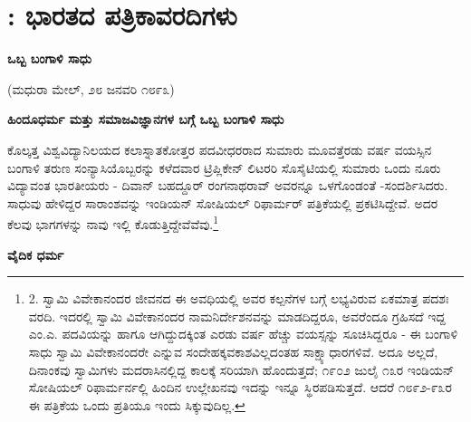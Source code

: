 
\chapter{: ಭಾರತದ ಪತ್ರಿಕಾವರದಿಗಳು}

\begin{center}
\textbf{ಒಬ್ಬ ಬಂಗಾಳಿ ಸಾಧು}
\end{center}

\begin{center}
(ಮಧುರಾ ಮೇಲ್, ೨೮ ಜನವರಿ ೧೮೯೩)
\end{center}

\begin{center}
\textbf{ಹಿಂದೂಧರ್ಮ ಮತ್ತು ಸಮಾಜವಿಜ್ಞಾನಗಳ ಬಗ್ಗೆ ಒಬ್ಬ ಬಂಗಾಳಿ ಸಾಧು}
\end{center}

ಕೊಲ್ಕತ್ತ ವಿಶ್ವವಿದ್ಯಾನಿಲಯದ ಕಲಾಸ್ನಾತಕೋತ್ತರ ಪದವೀಧರರಾದ ಸುಮಾರು ಮೂವತ್ತೆರಡು ವರ್ಷ ವಯಸ್ಸಿನ ಬಂಗಾಳಿ ತರುಣ ಸಂನ್ಯಾಸಿಯೊಬ್ಬರನ್ನು ಕಳೆದವಾರ ಟ್ರಿಪ್ಲಿಕೇನ್ ಲಿಟರರಿ ಸೊಸೈಟಿಯಲ್ಲಿ ಸುಮಾರು ಒಂದು ನೂರು ವಿದ್ಯಾವಂತ ಭಾರತೀಯರು - ದಿವಾನ್ ಬಹದ್ದೂರ್ ರಂಗನಾಥರಾವ್ ಅವರನ್ನೂ ಒಳಗೊಂಡಂತೆ -ಸಂದರ್ಶಿಸಿದರು. ಸಾಧುವು ಹೇಳಿದ್ದರ ಸಾರಾಂಶವನ್ನು ಇಂಡಿಯನ್ ಸೋಷಿಯಲ್ ರಿಫಾರ್ಮರ್ ಪತ್ರಿಕೆಯಲ್ಲಿ ಪ್ರಕಟಿಸಿದ್ದೇವೆ. ಅದರ ಕೆಲವು ಭಾಗಗಳನ್ನು ನಾವು ಇಲ್ಲಿ ಕೊಡುತ್ತಿದ್ದೇವೆವೆವು.\footnote{2. ಸ್ವಾಮಿ ವಿವೇಕಾನಂದರ ಜೀವನದ ಈ ಅವಧಿಯಲ್ಲಿ ಅವರ ಕಲ್ಪನೆಗಳ ಬಗ್ಗೆ ಲಭ್ಯವಿರುವ ಏಕಮಾತ್ರ ಪದಶಃ ವರದಿ. ಇದರಲ್ಲಿ ಸ್ವಾಮಿ ವಿವೇಕಾನಂದರ ನಾಮನಿರ್ದೇಶನವನ್ನು ಮಾಡದಿದ್ದರೂ, ಅವರೆಂದೂ ಗ್ರಹಿಸದೆ ಇದ್ದ ಎಂ.ಎ. ಪದವಿಯನ್ನು ಹಾಗೂ ಆಗಿದ್ದುದಕ್ಕಿಂತ ಎರಡು ವರ್ಷ ಹೆಚ್ಚು ವಯಸ್ಸನ್ನು ಸೂಚಿಸಿದ್ದರೂ - ಈ ಬಂಗಾಳಿ ಸಾಧು ಸ್ವಾಮಿ ವಿವೇಕಾನಂದರೇ ಎನ್ನುವ ಸಂದೇಹಕ್ಕವಕಾಶವಿಲ್ಲದಂತಹ ಸಾಕ್ಷ್ಯಾಧಾರಗಳಿವೆ. ಅದೂ ಅಲ್ಲದೆ, ದಿನಾಂಕವು ಸ್ವಾಮಿಗಳು ಮದರಾಸಿನಲ್ಲಿದ್ದ ಕಾಲಕ್ಕೆ ಸರಿಯಾಗಿ ಹೊಂದುತ್ತದೆ; ೧೯೦೨ ಜುಲೈ ೧೩ರ ಇಂಡಿಯನ್ ಸೋಷಿಯಲ್ ರಿಫಾರ್ಮರ್ನಲ್ಲಿ ಹಿಂದಿನ ಉಲ್ಲೇಖನವು ಇದನ್ನು ಇನ್ನೂ ಸ್ಥಿರಪಡಿಸುತ್ತದೆ. ಆದರೆ ೧೮೯೨-೯೩ರ ಈ ಪತ್ರಿಕೆಯ ಒಂದು ಪ್ರತಿಯೂ ಇಂದು ಸಿಕ್ಕುವುದಿಲ್ಲ.}

\begin{center}
\textbf{ವೈದಿಕ ಧರ್ಮ}
\end{center}

